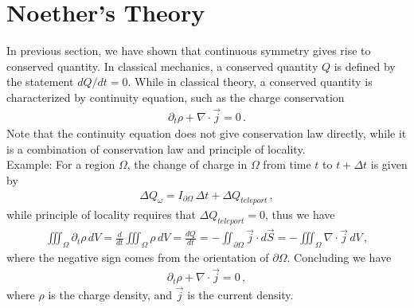 \documentclass[11pt, onesided]{book}
\theoremstyle{break}
\theoremstyle{break}
\newcommand{\pd}{\partial}
\newcommand{\example}{\color{green}Example: \color{black}}
\begin{document}
\newpage
\section[Noether's Theory]{\color{red}Noether's Theory\color{black}}
In previous section, we have shown that continuous symmetry gives rise to conserved quantity. In classical mechanics, a conserved quantity $Q$ is defined by the statement $dQ/dt = 0$. While in classical theory, a conserved quantity is characterized by continuity equation, such as the charge conservation
\begin{align*}
\pd_t \rho + \nabla \cdot \vec{j} = 0\,.
\end{align*}
Note that the continuity equation does not give conservation law directly, while it is a combination of conservation law and principle of locality. \\

\example For a region $\Omega$, the change of charge in $\Omega$ from time $t$ to $t+\Delta t$ is given by
\begin{align*}
\Delta Q_{\omega} = I_{\pd\Omega}\, \Delta t + \Delta Q_{teleport}\,,
\end{align*}
while principle of locality requires that $ \Delta Q_{teleport} = 0$, thus we have
\begin{align*}
\iiint_\Omega \pd_t\rho\, dV = \frac{d}{dt}\iiint_\Omega \rho\, dV = \frac{dQ}{dt} = -\iint_{\pd \Omega} \vec{j}\cdot d\vec{S}= - \iiint_{\Omega} \nabla\cdot \vec{j}\, dV \,,
\end{align*}
where the negative sign comes from the orientation of $\pd\Omega$. Concluding we have
\begin{align*}
\pd_t \rho + \nabla \cdot \vec{j} = 0\,,
\end{align*}
where $\rho$ is the charge density, and $\vec{j}$ is the current density. \\
\end{document}
